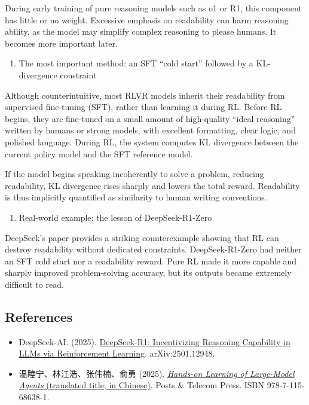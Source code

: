 During early training of pure reasoning models such as o1 or R1, this component has little or no weight. Excessive emphasis on readability can harm reasoning ability, as the model may simplify complex reasoning to please humans. It becomes more important later.

\begin{enumerate}
\def\labelenumi{\arabic{enumi}.}
\setcounter{enumi}{2}
\tightlist
\item
  The most important method: an SFT ``cold start'' followed by a KL-divergence constraint
\end{enumerate}

Although counterintuitive, most RLVR models inherit their readability from supervised fine-tuning (SFT), rather than learning it during RL. Before RL begins, they are fine-tuned on a small amount of high-quality ``ideal reasoning'' written by humans or strong models, with excellent formatting, clear logic, and polished language. During RL, the system computes KL divergence between the current policy model and the SFT reference model.

If the model begins speaking incoherently to solve a problem, reducing readability, KL divergence rises sharply and lowers the total reward. Readability is thus implicitly quantified as similarity to human writing conventions.

\begin{enumerate}
\def\labelenumi{\arabic{enumi}.}
\setcounter{enumi}{3}
\tightlist
\item
  Real-world example: the lesson of DeepSeek-R1-Zero
\end{enumerate}

DeepSeek's paper provides a striking counterexample showing that RL can destroy readability without dedicated constraints. DeepSeek-R1-Zero had neither an SFT cold start nor a readability reward. Pure RL made it more capable and sharply improved problem-solving accuracy, but its outputs became extremely difficult to read.

\FloatBarrier
{}
\hypertarget{references-82}{%
\subsection{References}\label{references-82}}

\vspace{0.25em}
\begin{itemize}
\tightlist
\item
  DeepSeek-AI. (2025). \href{https://arxiv.org/abs/2501.12948}{DeepSeek-R1: Incentivizing Reasoning Capability in LLMs via Reinforcement Learning}. arXiv:2501.12948.
\item
  温睦宁、林江浩、张伟楠、俞勇 (2025). \href{https://haa.boyuai.com/}{\emph{Hands-on Learning of Large-Model Agents} (translated title; in Chinese)}. Posts \& Telecom Press. ISBN 978-7-115-68638-1.
\end{itemize}

\clearpage
